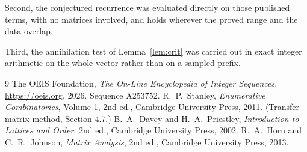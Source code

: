 \documentclass[11pt,a4paper]{article}
\theoremstyle{plain}
\theoremstyle{definition}
\begin{document}
Second, the conjectured recurrence was evaluated directly on those published terms, with no
matrices involved, and holds wherever the proved range and the data overlap.

Third, the annihilation test of Lemma~\ref{lem:crit} was carried out in exact integer
arithmetic on the whole vector rather than on a sampled prefix.

\begin{thebibliography}{9}
 The OEIS Foundation, \emph{The On-Line Encyclopedia of Integer
Sequences}, \url{https://oeis.org}, 2026. Sequence A253752.
 R.~P.~Stanley, \emph{Enumerative Combinatorics}, Volume 1, 2nd ed.,
Cambridge University Press, 2011. (Transfer-matrix method, Section 4.7.)
 B.~A.~Davey and H.~A.~Priestley, \emph{Introduction to Lattices and
Order}, 2nd ed., Cambridge University Press, 2002.
 R.~A.~Horn and C.~R.~Johnson, \emph{Matrix Analysis}, 2nd ed., Cambridge
University Press, 2013.
\end{thebibliography}
\end{document}
